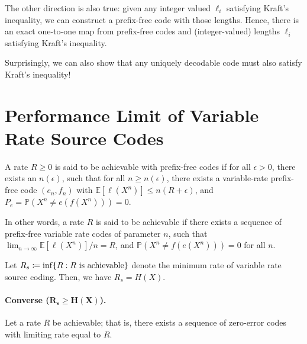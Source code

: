 \documentclass[12pt]{article}
\begin{document}
\begin{remark}
The other direction is also true: given any integer valued $\ell_i$ satisfying Kraft's inequality, we can construct a prefix-free code with those lengths. Hence, there is an exact one-to-one map from prefix-free codes and (integer-valued) lengths $\ell_i$ satisfying Kraft's inequality. 
\end{remark}

\begin{remark}
Surprisingly, we can also show that any uniquely decodable code must also satisfy Kraft's inequality! 
\end{remark}

\section{Performance Limit of Variable Rate Source Codes}


\begin{definition}
	\label{def:achievability-variable-rate} A rate $R \geq 0$ is said to be achievable with prefix-free codes if for all $\epsilon>0$, there exists an $n(\epsilon)$, such that for all $n \geq n(\epsilon)$,
		there exists a variable-rate prefix-free code $(e_n, f_n)$ with $\mathbb{E}[\ell(X^n)] \leq n (R+\epsilon)$, and $P_e = \mathbb{P}(X^n \neq e(f(X^n))) = 0$. 

	In other words, a rate $R$ is said to be achievable if there exists a sequence of prefix-free variable rate codes of parameter $n$, such that $\lim_{n \to \infty} \mathbb{E}[\ell(X^n)]/n = R$, and $\mathbb{P}(X^n \neq f(e(X^n))) = 0$ for all $n$.  
\end{definition}


	 


\begin{theorem}
\label{thm:source-coding-variable-rate}
Let $R_s \coloneqq \inf \{R: R \text{ is achievable}\}$ denote the minimum rate of variable rate source coding. Then, we have 
$R_s = H(X)$. 
\end{theorem}



\paragraph{Converse ($\boldsymbol{R_s \geq H(X)}$).} Let a rate $R$ be achievable; that is, there exists a sequence of zero-error codes with limiting rate equal to $R$.  
\end{document}
